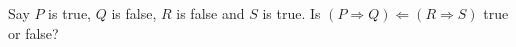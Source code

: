 Say $P$ is true, $Q$ is false, $R$ is false and $S$ is true. Is $(P\Rightarrow Q)\Leftarrow(R\Rightarrow S)$ true or false?

